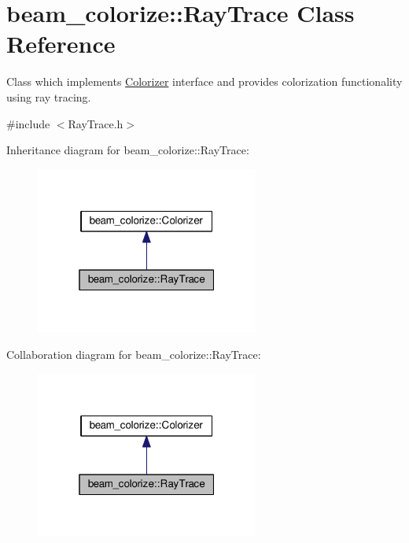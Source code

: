 \hypertarget{classbeam__colorize_1_1_ray_trace}{}\section{beam\+\_\+colorize\+:\+:Ray\+Trace Class Reference}
\label{classbeam__colorize_1_1_ray_trace}


Class which implements \hyperlink{classbeam__colorize_1_1_colorizer}{Colorizer} interface and provides colorization functionality using ray tracing.  




{\ttfamily \#include $<$Ray\+Trace.\+h$>$}



Inheritance diagram for beam\+\_\+colorize\+:\+:Ray\+Trace\+:\nopagebreak
\begin{figure}[H]
\begin{center}
\leavevmode
\includegraphics[width=208pt]{classbeam__colorize_1_1_ray_trace__inherit__graph}
\end{center}
\end{figure}


Collaboration diagram for beam\+\_\+colorize\+:\+:Ray\+Trace\+:\nopagebreak
\begin{figure}[H]
\begin{center}
\leavevmode
\includegraphics[width=208pt]{classbeam__colorize_1_1_ray_trace__coll__graph}
\end{center}
\end{figure}
